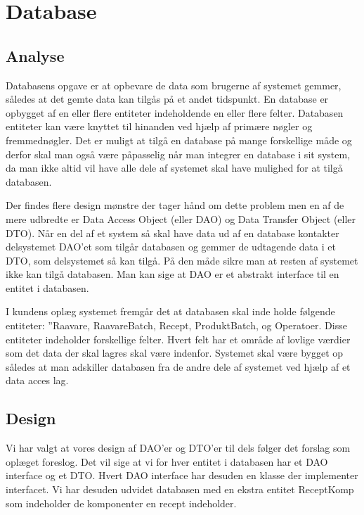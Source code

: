 \documentclass[a4paper]{article}
\begin{document}
\clearpage



\section{Database} %

\subsection{Analyse} %

Databasens opgave er at opbevare de data som brugerne af systemet gemmer, således at det gemte data kan tilgås på et andet tidspunkt. En database er opbygget af en eller flere entiteter indeholdende en eller flere felter. Databasen entiteter kan være knyttet til hinanden ved hjælp af primære nøgler og fremmednøgler. Det er muligt at tilgå en database på mange forskellige måde og derfor skal man også være påpasselig når man integrer en database i sit system, da man ikke altid vil have alle dele af systemet skal have mulighed for at tilgå databasen. 

Der findes flere design mønstre der tager hånd om dette problem men en af de mere udbredte er Data Access Object (eller DAO) og Data Transfer Object (eller DTO). Når en del af et system så skal have data ud af en database kontakter delsystemet DAO’et som tilgår databasen og gemmer de udtagende data i et DTO, som delsystemet så kan tilgå. På den måde sikre man at resten af systemet ikke kan tilgå databasen. Man kan sige at DAO er et abstrakt interface til en entitet i databasen.

I kundens oplæg systemet fremgår det at databasen skal inde holde følgende entiteter: ”Raavare, RaavareBatch, Recept, ProduktBatch, og Operatoer. Disse entiteter indeholder forskellige felter. Hvert felt har et område af lovlige værdier som det data der skal lagres skal være indenfor.
Systemet skal være bygget op således at man adskiller databasen fra de andre dele af systemet ved hjælp af et data acces lag.


\subsection{Design} %

Vi har valgt at vores design af DAO’er og DTO’er til dels følger det forslag som oplæget foreslog. Det vil sige at vi for hver entitet i databasen har et DAO interface og et DTO. Hvert DAO interface har desuden en klasse der implementer interfacet. Vi har desuden udvidet databasen med en ekstra entitet ReceptKomp som indeholder de komponenter en recept indeholder.
\end{document}
